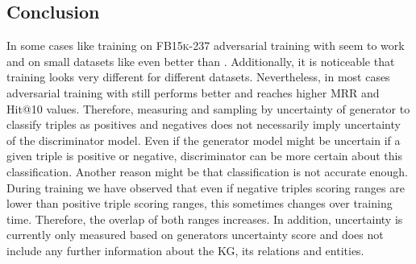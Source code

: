 \subsection{Conclusion}
\label{subsec:uncertainty_conclusion}
%
In some cases like training on \textsc{FB15k-237} adversarial training with \ussoftmax seem to work and on small datasets like \umls even better than \origsampling.
Additionally, it is noticeable that training looks very different for different datasets.
Nevertheless, in most cases adversarial training with \origsampling still performs better and reaches higher MRR and Hit@10 values.
Therefore, measuring and sampling by uncertainty of generator to classify triples as positives and negatives does not necessarily imply uncertainty of the discriminator model.
Even if the generator model might be uncertain if a given triple is positive or negative, discriminator can be more certain about this classification.
Another reason might be that classification is not accurate enough.
During training we have observed that even if negative triples scoring ranges are lower than positive triple scoring ranges, this sometimes changes over training time.
Therefore, the overlap of both ranges increases.
In addition, uncertainty is currently only measured based on generators uncertainty score and does not include any further information about the \ac{KG}, its relations and entities.








